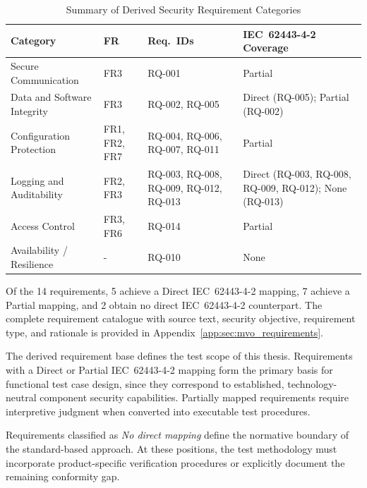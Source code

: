 \renewcommand{\arraystretch}{1.2}
\begin{table}[htbp]
	\caption{Summary of Derived Security Requirement Categories}
	\label{tab:req_categories}
	\centering
	\begin{tabularx}{\textwidth}{|l | X | X | X|}
		\toprule
		\textbf{Category} & \textbf{FR} & \textbf{Req.\ IDs} & \textbf{IEC~62443-4-2 Coverage} \\
		\midrule
		Secure Communication        & FR3              & RQ-001                                   & Partial \\
		Data and Software Integrity & FR3              & RQ-002, RQ-005                           & Direct (RQ-005); Partial (RQ-002) \\
		Configuration Protection    & FR1, FR2, FR7    & RQ-004, RQ-006, RQ-007, RQ-011           & Partial \\
		Logging and Auditability    & FR2, FR3         & RQ-003, RQ-008, RQ-009, RQ-012, RQ-013  & Direct (RQ-003, RQ-008, RQ-009, RQ-012); None (RQ-013) \\
		Access Control              & FR3, FR6         & RQ-014                                   & Partial \\
		Availability / Resilience   & -              & RQ-010                                   & None \\
		\bottomrule
	\end{tabularx}
\end{table}

Of the 14 requirements, 5 achieve a Direct IEC~62443-4-2 mapping, 7 achieve a Partial mapping, and 2 obtain no direct IEC~62443-4-2 counterpart. The complete requirement catalogue with source text, security objective, requirement type, and rationale is provided in Appendix~\ref{app:sec:mvo_requirements}.


The derived requirement base defines the test scope of this thesis. Requirements with a Direct or Partial IEC~62443-4-2 mapping form the primary basis for functional test case design, since they correspond to established, technology-neutral component security capabilities. Partially mapped requirements require interpretive judgment when converted into executable test procedures.

Requirements classified as \emph{No direct mapping} define the normative boundary of the standard-based approach. At these positions, the test methodology must incorporate product-specific verification procedures or explicitly document the remaining conformity gap.

